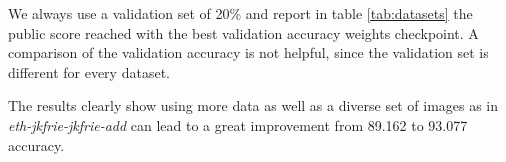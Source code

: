  We always use a validation set of 20\% and report in table \ref{tab:datasets} the public score reached with the best validation accuracy weights checkpoint. A comparison of the validation accuracy is not helpful, since the validation set is different for every dataset.

The results clearly show using more data as well as a diverse set of images as in \emph{\acrshort{eth}-jkfrie-jkfrie-add} can lead to a great improvement from 89.162 to 93.077 accuracy.


\begin{comment}

Furthermore, we pre-trained our models on images from \acrfull{osm} \cite{}, which do not contain accurate pixel level masks, but only the center line of roads with a fixed width. The respective experiment is described in \ref{}.

\end{comment}